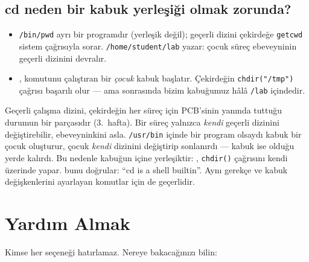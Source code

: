 \subsection{cd neden bir kabuk yerleşiği olmak zorunda?}
\label{sec:cdbuiltin}


\begin{itemize}
  \item \texttt{/bin/pwd} ayrı bir programdır (yerleşik  değil); geçerli dizini çekirdeğe \texttt{getcwd} sistem çağrısıyla sorar. \texttt{/home/student/lab} yazar: çocuk süreç ebeveyninin geçerli dizinini devralır.
  \item {},  komutunu çalıştıran bir \emph{çocuk} kabuk başlatır. Çekirdeğin \texttt{chdir("/tmp")} çağrısı başarılı olur --- ama sonrasında bizim kabuğumuz hâlâ \texttt{\tl/lab} içindedir.
\end{itemize}

\begin{keyidea}
Geçerli çalışma dizini, çekirdeğin her süreç için PCB'sinin yanında tuttuğu durumun bir parçasıdır (3.\ hafta). Bir süreç yalnızca \emph{kendi} geçerli dizinini değiştirebilir, ebeveyninkini asla.  \texttt{/usr/bin} içinde bir program olsaydı kabuk bir çocuk oluşturur, çocuk \emph{kendi} dizinini değiştirip sonlanırdı --- kabuk ise olduğu yerde kalırdı. Bu nedenle  kabuğun içine yerleşiktir: , \texttt{chdir()} çağrısını kendi üzerinde yapar.  bunu doğrular: ``cd is a shell builtin''. Aynı gerekçe  ve kabuk değişkenlerini ayarlayan komutlar için de geçerlidir.
\end{keyidea}

\section{Yardım Almak}
\label{sec:help}

Kimse her seçeneği hatırlamaz. Nereye bakacağınızı bilin:

